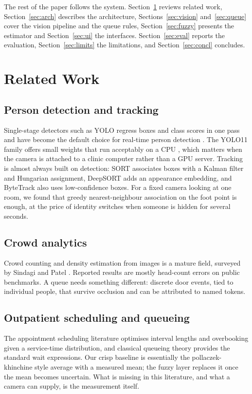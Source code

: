 \documentclass[conference]{IEEEtran}
\begin{document}
The rest of the paper follows the system. Section~\ref{sec:related} reviews
related work, Section~\ref{sec:arch} describes the architecture,
Sections~\ref{sec:vision} and~\ref{sec:queue} cover the vision pipeline and the
queue rules, Section~\ref{sec:fuzzy} presents the estimator and
Section~\ref{sec:ui} the interfaces. Section~\ref{sec:eval} reports the
evaluation, Section~\ref{sec:limits} the limitations, and
Section~\ref{sec:concl} concludes.

\section{Related Work}
\label{sec:related}

\subsection{Person detection and tracking}
Single-stage detectors such as YOLO regress boxes and class scores in one pass
and have become the default choice for real-time person detection
\cite{redmon2016yolo,redmon2018yolov3}. The YOLO11 family offers small weights
that run acceptably on a CPU \cite{ultralytics2024}, which matters when the
camera is attached to a clinic computer rather than a GPU server. Tracking is
almost always built on detection: SORT \cite{bewley2016sort} associates boxes
with a Kalman filter and Hungarian assignment, DeepSORT
\cite{wojke2017deepsort} adds an appearance embedding, and ByteTrack
\cite{zhang2022bytetrack} also uses low-confidence boxes. For a fixed camera
looking at one room, we found that greedy nearest-neighbour association on the
foot point is enough, at the price of identity switches when someone is hidden
for several seconds.

\subsection{Crowd analytics}
Crowd counting and density estimation from images is a mature field, surveyed
by Sindagi and Patel \cite{sindagi2018}. Reported results are mostly head-count
errors on public benchmarks. A queue needs something different: discrete door
events, tied to individual people, that survive occlusion and can be attributed
to named tokens.

\subsection{Outpatient scheduling and queueing}
The appointment scheduling literature \cite{cayirli2003,gupta2008} optimises
interval lengths and overbooking given a service-time distribution, and
classical queueing theory \cite{gross2018} provides the standard wait
expressions. Our crisp baseline is essentially the pollaczek-khinchine style
average with a measured mean; the fuzzy layer replaces it once the mean becomes
uncertain. What is missing in this literature, and what a camera can supply, is
the measurement itself.
\end{document}
